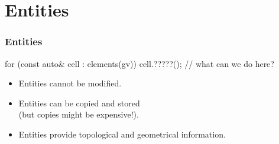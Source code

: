 \documentclass[aspectratio=169,11pt]{beamer}
\theoremstyle{definition}
\begin{document}


\section{Entities}

\begin{frame}[fragile] \frametitle{Entities}


  \begin{cppcode}
for (const auto& cell : elements(gv)) {
  cell.?????(); // what can we do here?
}
  \end{cppcode}

  \pause
  \begin{itemize}
  \item Entities cannot be modified.
  \item Entities can be copied and stored\\(but copies might be expensive!).
    \pause
  \item Entities provide topological and geometrical information.
  \end{itemize}
\end{frame}
\end{document}
